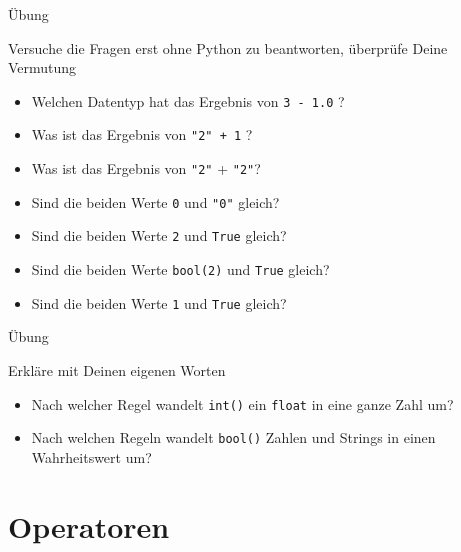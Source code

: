 \documentclass[algorithm,pgfplots,colortheme=dark]{cuzbeamer}
\newcommand{\py}[1]{\texttt{#1}}
\begin{document}
	
	\begin{frame}{Übung}
		
		\begin{block}{Versuche die Fragen erst ohne Python zu beantworten, überprüfe Deine Vermutung}
			\begin{itemize}
				\item Welchen Datentyp hat das Ergebnis von \py{3 - 1.0} ?
				\item Was ist das Ergebnis von \py{"2" + 1} ? 
				\item Was ist das Ergebnis von \py{"2"} + \py{"2"}? 
				\item Sind die beiden Werte \py{0} und \py{"0"} gleich? 
				\item Sind die beiden Werte \py{2} und \py{True} gleich? 
				\item Sind die beiden Werte \py{bool(2)} und \py{True} gleich? 
				\item Sind die beiden Werte \py{1} und \py{True} gleich? 
			\end{itemize}
		\end{block}
		
		
	\end{frame}

	\begin{frame}{Übung}
	
	\begin{block}{Erkläre mit Deinen eigenen Worten}
		\begin{itemize}
			\item Nach welcher Regel wandelt \py{int()} ein \py{float} in eine ganze Zahl um? 
			\item Nach welchen Regeln wandelt \py{bool()} Zahlen und Strings in einen Wahrheitswert um? 
		\end{itemize}
	\end{block}
	
	
\end{frame}




\section{Operatoren}
\end{document}
